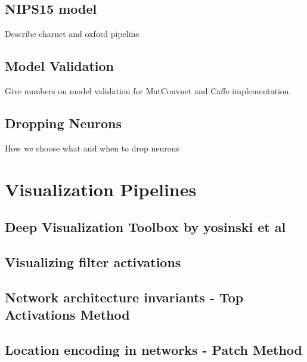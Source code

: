 \documentclass[10pt,twocolumn,letterpaper]{article}
\begin{document}
\subsection{NIPS15 model}
Describe charnet and oxford pipeline

\subsection{Model Validation}
Give numbers on model validation for MatConvnet and Caffe implementation.

\subsection{Dropping Neurons}
How we choose what and when to drop neurons

\section{Visualization Pipelines}

\subsection{Deep Visualization Toolbox by yosinski et al}

\subsection{Visualizing filter activations}

\subsection{Network architecture invariants - Top Activations Method}

\subsection{Location encoding in networks - Patch Method}
\end{document}
